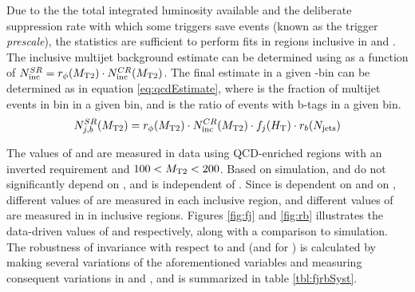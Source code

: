 Due to the the total integrated luminosity available and the deliberate suppression rate with which some \HT triggers save events (known as the trigger {\it prescale}), the statistics are sufficient to perform fits in \HT regions inclusive in \nj and \nb. The inclusive multijet background estimate can be determined using \rphi as a function of \mttwo $N_{\mathrm{inc}}^{SR} = r_\phi (M_{\mathrm{T2}}) \cdot N_{\mathrm{inc}}^{CR} (M_{\mathrm{T2}})$. The final estimate in a given \nj-\nb bin can be determined as in equation \ref{eq:qcdEstimate}, where \fj is the fraction of multijet events in bin \nj in a given \HT bin, and \rb is the ratio of events with \nb b-tags in a given \nj bin. 
\begin{equation}
	N_{j,b}^{SR}(M_{\mathrm{T2}}) = r_\phi (M_{\mathrm{T2}}) \cdot N_{\mathrm{inc}}^{CR} (M_{\mathrm{T2}}) \cdot f_j (H_{\mathrm{T}}) \cdot r_b (N_{\mathrm{jets}}) 
	\label{eq:qcdEstimate}
\end{equation}

The values of \fj and \rb are measured in data using QCD-enriched regions with an inverted \dphi requirement and $100 < M_{\mathrm{T2}} < 200$. Based on simulation, \fj and \rb do not significantly depend on \mttwo, and \rb is independent of \HT. Since \fj is dependent on \HT and \rb on \nj, different values of \fj are measured in each inclusive \HT region, and different values of \rb are measured in in inclusive \nj regions. Figures \ref{fig:fj} and \ref{fig:rb} illustrates the data-driven values of \fj and \rb respectively, along with a comparison to simulation. The robustness of invariance with respect to \mttwo and \dphi (and \HT for \rb) is calculated by making several variations of the aforementioned variables and measuring consequent variations in \fj and \rb, and is summarized in table \ref{tbl:fjrbSyst}.


